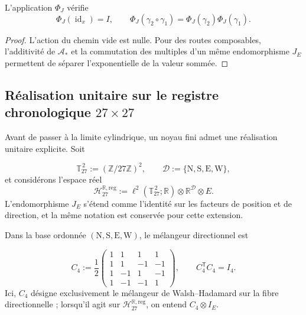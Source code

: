 \begin{proposition}
\label{prop:fase-interna-functor-rev2}
L’application \(\Phi_J\) vérifie
\[
 \Phi_J(\operatorname{id}_x)=I,
 \qquad
 \Phi_J(\gamma_2\circ\gamma_1)
 =\Phi_J(\gamma_2)\Phi_J(\gamma_1).
\]
\end{proposition}

\begin{proof}
L’action du chemin vide est nulle. Pour des routes composables, l’additivité de
\(\mathcal A_*\) et la commutation des multiples d’un même endomorphisme
\(J_E\) permettent de séparer l’exponentielle de la valeur sommée.
\end{proof}

\subsection{Réalisation unitaire sur le registre chronologique
\texorpdfstring{\(27\times27\)}{27 x 27}
}
\label{sec:realizacion-unitaria-registro-27-rev3}

Avant de passer à la limite cylindrique, un noyau fini admet une réalisation
unitaire explicite. Soit

\[
 \mathbb T_{27}^{\,2}:=(\mathbb Z/27\mathbb Z)^2,
 \qquad
 \mathcal D:=\{\mathrm N,\mathrm S,\mathrm E,\mathrm W\},
\]
et considérons l’espace réel
\[
 \mathcal H_{27}^{\mathbb R,\mathrm{reg}}
 :=\ell^2(\mathbb T_{27}^{\,2};\mathbb R)
   \otimes\mathbb R^{\mathcal D}\otimes E.
\]
L'endomorphisme \(J_E\) s'étend comme l'identité sur les facteurs de position et de direction, et la même notation est conservée pour cette extension.

Dans la base ordonnée
\((\mathrm N,\mathrm S,\mathrm E,\mathrm W)\), le mélangeur directionnel est

\begin{equation}
 C_4:=\frac12
 \begin{pmatrix}
  1&1&1&1\\
  1&1&-1&-1\\
  1&-1&1&-1\\
  1&-1&-1&1
 \end{pmatrix},
 \qquad C_4^{\mathsf T}C_4=I_4.
 \label{eq:mezclador-walsh-registro-27-rev3}
\end{equation}
Ici, \(C_4\) désigne exclusivement le mélangeur de Walsh--Hadamard sur la
fibre directionnelle ; lorsqu’il agit sur
\(\mathcal H_{27}^{\mathbb R,\mathrm{reg}}\), on entend
\(C_4\otimes I_E\).


